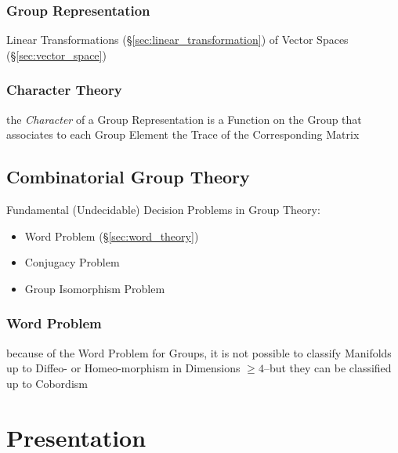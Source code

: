\begin{itemize}
\subsubsection{Group Representation}\label{sec:group_representation}

Linear Transformations (\S\ref{sec:linear_transformation}) of Vector Spaces
(\S\ref{sec:vector_space})



\subsubsection{Character Theory}\label{sec:character_theory}

the \emph{Character} of a Group Representation is a Function on the Group that
associates to each Group Element the Trace of the Corresponding Matrix



\subsection{Combinatorial Group Theory}\label{sec:combinatorial_group_theory}

Fundamental (Undecidable) Decision Problems in Group Theory:
\begin{itemize}
  \item Word Problem (\S\ref{sec:word_theory})
  \item Conjugacy Problem
  \item Group Isomorphism Problem
\end{itemize}



\subsubsection{Word Problem}\label{sec:word_problem}

because of the Word Problem for Groups, it is not possible to classify
Manifolds up to Diffeo- or Homeo-morphism in Dimensions $\geq 4$--but they can
be classified up to Cobordism




\section{Presentation}\label{sec:presentation}


\end{itemize}
